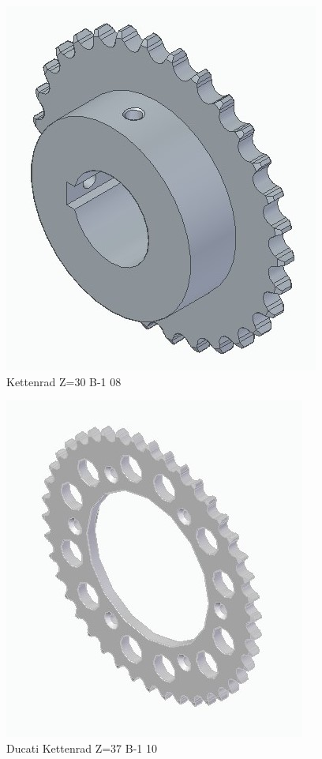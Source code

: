 \begin{figure} [H]
	\begin{center}
		\includegraphics[scale=0.3]{figures/mechanik/10583038.jpg}
			\caption{Kettenrad Z=30 B-1 08}
			\label{fig:Kettenrad Z=30 B-1 08}
	\end{center}
\end{figure}


\begin{figure} [H]
	\begin{center}
		\includegraphics[scale=0.3]{figures/mechanik/2000 Monster M750 swingarm, suspension.jpg}
			\caption{Ducati Kettenrad Z=37 B-1 10}
			\label{fig:Ducati Kettenrad Z=37 B-1 10}
	\end{center}
\end{figure}

